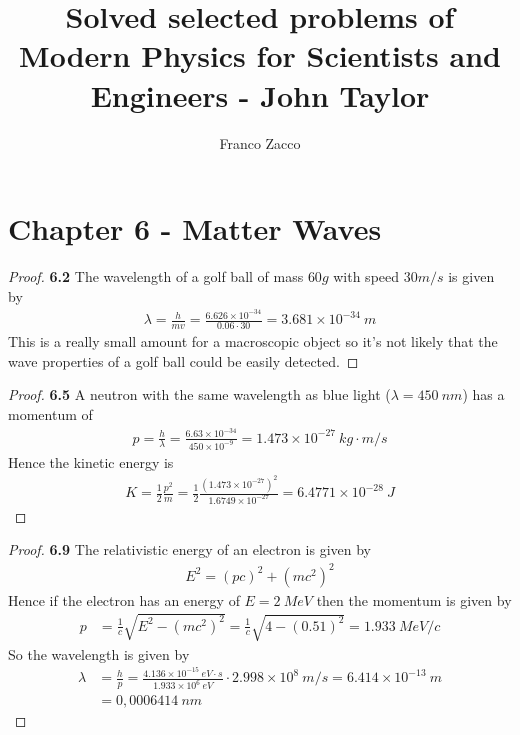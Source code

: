 \documentclass[11pt]{article}
\title{\textbf{Solved selected problems of Modern Physics for Scientists and Engineers - John Taylor}}
\author{Franco Zacco}
\date{}
\theoremstyle{definition}
\begin{document}
\maketitle
\thispagestyle{empty}

\section*{Chapter 6 - Matter Waves}

\begin{proof}{\textbf{6.2}}
    The wavelength of a golf ball of mass $60 g$ with speed $30 m/s$ is given
    by
    \begin{align*}
        \lambda = \frac{h}{mv}
        = \frac{6.626 \times 10^{-34}}{0.06 \cdot 30}
        = 3.681 \times 10^{-34}~m
    \end{align*}
    This is a really small amount for a macroscopic object so it's not likely
    that the wave properties of a golf ball could be easily detected.
\end{proof}
\begin{proof}{\textbf{6.5}}
    A neutron with the same wavelength as blue light ($\lambda = 450~nm$)
    has a momentum of
    \begin{align*}
        p = \frac{h}{\lambda} = \frac{6.63 \times 10^{-34}}{450 \times 10^{-9}}
        = 1.473 \times 10^{-27}~kg\cdot m/s
    \end{align*}
    Hence the kinetic energy is
    \begin{align*}
        K = \frac{1}{2}\frac{p^2}{m}
        = \frac{1}{2}\frac{(1.473 \times 10^{-27})^2}{1.6749 \times 10^{-27}}
        = 6.4771 \times 10^{-28}~J
    \end{align*}
\end{proof}
\begin{proof}{\textbf{6.9}}
    The relativistic energy of an electron is given by
    \begin{align*}
        E^2 = (pc)^2 + (mc^2)^2
    \end{align*}
    Hence if the electron has an energy of $E = 2~MeV$ then the momentum is
    given by
    \begin{align*}
        p &= \frac{1}{c}\sqrt{E^2 - (mc^2)^2}
        = \frac{1}{c}\sqrt{4 - (0.51)^2}
        = 1.933~MeV/c
    \end{align*}
    So the wavelength is given by
    \begin{align*}
        \lambda &= \frac{h}{p} =
        \frac{4.136 \times 10^{-15}~eV\cdot s}{1.933 \times 10^6~eV}
        \cdot 2.998 \times 10^{8}~m/s
        = 6.414 \times 10^{-13}~m\\
        &= 0,0006414~nm
    \end{align*}
\end{proof}
\end{document}
